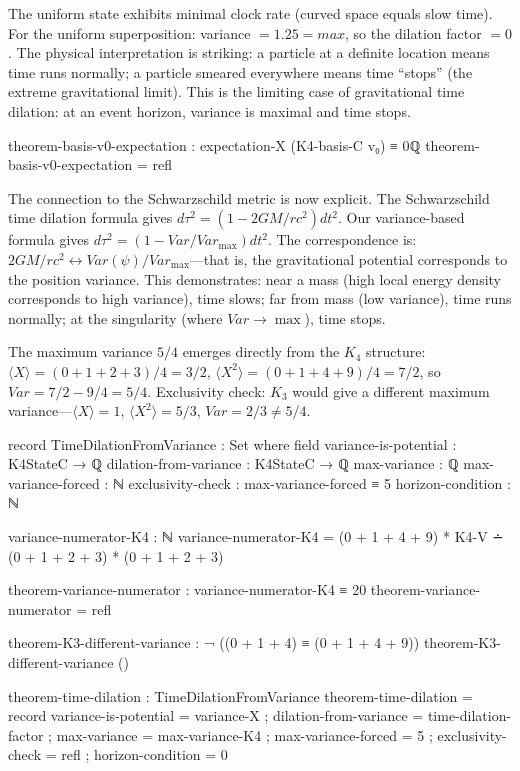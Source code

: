 \documentclass[11pt,a4paper]{book}
\def\text#1{#1}%
\begin{document}
The uniform state exhibits minimal clock rate (curved space equals slow time). For the uniform superposition: variance $= 1.25 = \text{max}$, so the dilation factor $= 0$. The physical interpretation is striking: a particle at a definite location means time runs normally; a particle smeared everywhere means time ``stops'' (the extreme gravitational limit). This is the limiting case of gravitational time dilation: at an event horizon, variance is maximal and time stops.

\begin{code}
theorem-basis-v0-expectation : expectation-X (K4-basis-C v₀) ≡ 0ℚ
theorem-basis-v0-expectation = refl
\end{code}

The connection to the Schwarzschild metric is now explicit. The Schwarzschild time dilation formula gives $d\tau^2 = (1 - 2GM/rc^2) dt^2$. Our variance-based formula gives $d\tau^2 = (1 - \text{Var}/\text{Var}_{\max}) dt^2$. The correspondence is: $2GM/rc^2 \leftrightarrow \text{Var}(\psi)/\text{Var}_{\max}$---that is, the gravitational potential corresponds to the position variance. This demonstrates: near a mass (high local energy density corresponds to high variance), time slows; far from mass (low variance), time runs normally; at the singularity (where $\text{Var} \to \max$), time stops.

The maximum variance $5/4$ emerges directly from the $K_4$ structure: $\langle X\rangle = (0+1+2+3)/4 = 3/2$, $\langle X^2\rangle = (0+1+4+9)/4 = 7/2$, so $\text{Var} = 7/2 - 9/4 = 5/4$. Exclusivity check: $K_3$ would give a different maximum variance---$\langle X\rangle = 1$, $\langle X^2\rangle = 5/3$, $\text{Var} = 2/3 \neq 5/4$.

\begin{code}
record TimeDilationFromVariance : Set where
  field
    variance-is-potential : K4StateC → ℚ
    dilation-from-variance : K4StateC → ℚ
    max-variance : ℚ
    max-variance-forced : ℕ
    exclusivity-check : max-variance-forced ≡ 5
    horizon-condition : ℕ

variance-numerator-K4 : ℕ
variance-numerator-K4 = (0 + 1 + 4 + 9) * K4-V ∸ (0 + 1 + 2 + 3) * (0 + 1 + 2 + 3)

theorem-variance-numerator : variance-numerator-K4 ≡ 20
theorem-variance-numerator = refl

theorem-K3-different-variance : ¬ ((0 + 1 + 4) ≡ (0 + 1 + 4 + 9))
theorem-K3-different-variance ()

theorem-time-dilation : TimeDilationFromVariance
theorem-time-dilation = record
  { variance-is-potential = variance-X
  ; dilation-from-variance = time-dilation-factor
  ; max-variance = max-variance-K4
  ; max-variance-forced = 5
  ; exclusivity-check = refl
  ; horizon-condition = 0
  }
\end{code}
\end{document}
